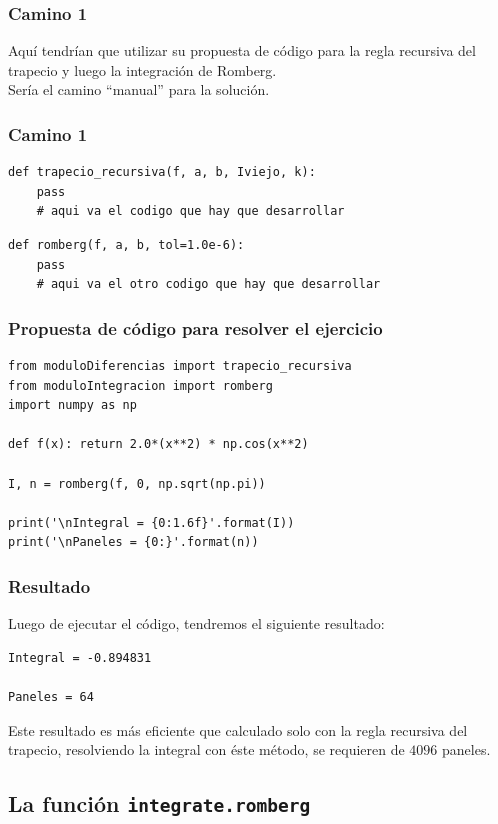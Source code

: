 \documentclass[12pt]{beamer}
\begin{document}
\begin{frame}
\frametitle{Camino 1}
Aquí tendrían que utilizar su propuesta de código para la regla recursiva del trapecio y luego la integración de Romberg.
\\
\bigskip
\pause
Sería el camino \enquote{manual} para la solución.
\end{frame}
\begin{frame}
\frametitle{Camino 1}
\begin{lstlisting}[caption=Función para la regla recursiva del trapecio]
def trapecio_recursiva(f, a, b, Iviejo, k):
    pass
    # aqui va el codigo que hay que desarrollar
\end{lstlisting}
\end{frame}
\begin{frame}
\begin{lstlisting}[caption=Función para la integración de Romberg]
def romberg(f, a, b, tol=1.0e-6):
    pass
    # aqui va el otro codigo que hay que desarrollar
\end{lstlisting}
\end{frame}
\begin{frame}
\frametitle{Propuesta de código para resolver el ejercicio}
\begin{lstlisting}[caption=Código que evalúa la integral con el método de Romberg]
from moduloDiferencias import trapecio_recursiva
from moduloIntegracion import romberg
import numpy as np

def f(x): return 2.0*(x**2) * np.cos(x**2)

I, n = romberg(f, 0, np.sqrt(np.pi))

print('\nIntegral = {0:1.6f}'.format(I))
print('\nPaneles = {0:}'.format(n))
\end{lstlisting}
\end{frame}
\begin{frame}[fragile]
\frametitle{Resultado}
Luego de ejecutar el código, tendremos el siguiente resultado:
\pause
\begin{verbatim}
Integral = -0.894831

Paneles = 64
\end{verbatim}
\pause
Este resultado es más eficiente que calculado solo con la regla recursiva del trapecio, \pause resolviendo la integral con éste método, se requieren de $4096$ paneles.
\end{frame}

\subsection{La función \texttt{integrate.romberg}}
\end{document}
